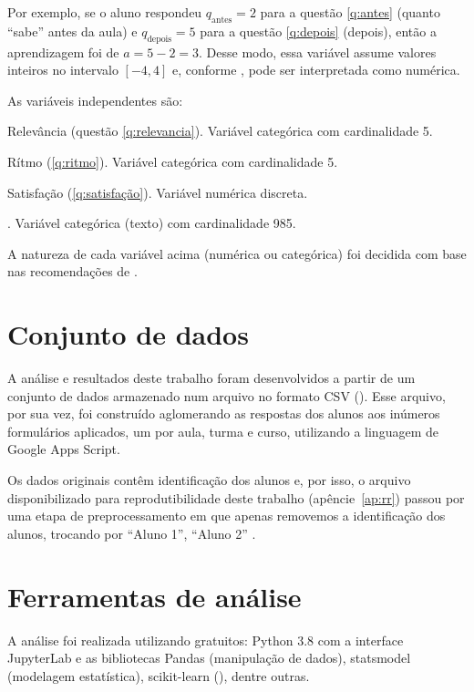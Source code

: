 Por exemplo, se o aluno respondeu $q_\text{antes} = 2$ para a questão \ref{q:antes} (quanto ``sabe'' antes da aula) e $q_\text{depois} = 5$ para a questão \ref{q:depois} (depois), então a aprendizagem foi de $a = 5 - 2 = 3$.
Desse modo, essa variável assume valores inteiros no intervalo $[-4,4]$ e, conforme \cite{Harpe2015}, pode ser interpretada como numérica.

As variáveis independentes são:
\begin{compactitem}
	\item Relevância (questão \ref{q:relevancia}).
	Variável categórica com cardinalidade 5.

	\item Rítmo (\ref{q:ritmo}).
	Variável categórica com cardinalidade 5.

	\item Satisfação (\ref{q:satisfação}).
	Variável numérica discreta.

	\item {}.
	Variável categórica (texto) com cardinalidade 985.
\end{compactitem}

A natureza de cada variável acima (numérica ou categórica) foi decidida com base nas recomendações de \cite{Harpe2015}.

\section{Conjunto de dados}

A análise e resultados deste trabalho foram desenvolvidos a partir de um conjunto de dados armazenado num arquivo no formato CSV ().
Esse arquivo, por sua vez, foi construído aglomerando as respostas dos alunos aos inúmeros formulários aplicados, um por aula, turma e curso, utilizando a linguagem de  Google Apps Script.

Os dados originais contêm identificação dos alunos e, por isso, o arquivo disponibilizado para reprodutibilidade deste trabalho (apêncie~\ref{ap:rr}) passou por uma etapa de preprocessamento em que apenas removemos a identificação dos alunos, trocando por ``Aluno 1'', ``Aluno 2'' \etc.

\section{Ferramentas de análise}

A análise foi realizada utilizando  gratuitos: Python 3.8 com a interface JupyterLab e as bibliotecas Pandas (manipulação de dados), statsmodel (modelagem estatística), scikit-learn (), dentre outras.
